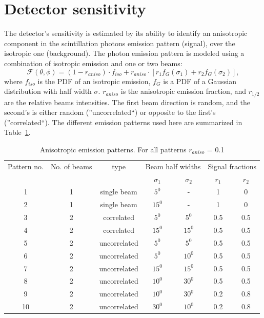 \section{Detector sensitivity}
\label{sec:sim}
The detector's sensitivity is estimated by its ability to identify an anisotropic component in the scintillation photons emission pattern (signal), over the isotropic one (background). The photon emission pattern is modeled using a combination of isotropic emission and one or two beams:
\begin{equation}
\mathcal{F}(\theta,\phi) = (1-r_{aniso}) \cdot f_{iso} + r_{aniso}\cdot\left[r_1 f_G(\sigma_1) + r_2 f_G(\sigma_2) \right], 
\end{equation}  
where  $f_{iso}$ is the PDF of an isotropic emission, $f_G$ is a PDF of a Gaussian distribution with half width $\sigma$. $r_{aniso}$ is the anisotropic emission fraction, and $r_{1/2}$ are the relative beams intensities. The first beam direction is random, and the second's is either random 
(''uncorrelated``) or opposite to the first's (''correlated``). The different emission patterns used here are summarized in Table~\ref{tab:AnisoPattern}.
 
\begin{table}[h]
  \centering
  \caption{Anisotropic emission patterns. For all patterns $r_{aniso}$ = 0.1}
  \label{tab:AnisoPattern}
  \begin{tabular}{|c |c |c|cc|cc|}
  \hline
  Pattern no. & No. of beams & type & \multicolumn{2}{c|}{Beam half widths}& \multicolumn{2}{c|}{Signal fractions} \\
  &              &      &  $\sigma_1$ & $\sigma_2$   &  $r_1$ & $r_2$    \\
  \hline
  1 & 1 & single beam & $5^{0}$ & - & 1 & 0\\
   2 & 1 & single beam & $15^{0}$ & - & 1 & 0\\
   3 & 2 & correlated & $5^{0}$ & $5^{0}$ & 0.5 & 0.5  \\
   4 & 2 & correlated & $15^{0}$ & $15^{0}$ & 0.5 & 0.5 \\
   5 & 2 & uncorrelated & $5^{0}$ & $5^{0}$ & 0.5 & 0.5 \\
   6 & 2 & uncorrelated & $5^{0}$ & $10^{0}$ & 0.5 & 0.5 \\
   7 & 2 & uncorrelated & $15^{0}$ & $15^{0}$ & 0.5 & 0.5 \\
   8 & 2 & uncorrelated & $10^{0}$ & $30^{0}$ & 0.5 & 0.5 \\
   9 & 2 & uncorrelated & $10^{0}$ & $30^{0}$ & 0.2 & 0.8 \\
    10 & 2 & uncorrelated & $30^{0}$ & $10^{0}$ & 0.2 & 0.8 \\
  \hline
 \end{tabular}
\end{table} 
 
